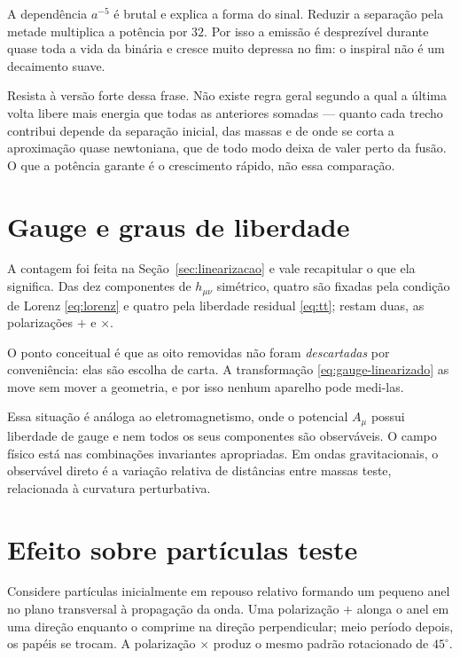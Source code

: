 \documentclass[12pt,a4paper,oneside]{book}
\theoremstyle{rgplain}
\theoremstyle{rgremark}
\begin{document}
\begin{atencao}
A dependência $a^{-5}$ é brutal e explica a forma do sinal. Reduzir a
separação pela metade multiplica a potência por $32$. Por isso a emissão é
desprezível durante quase toda a vida da binária e cresce muito depressa no
fim: o inspiral não é um decaimento suave.

Resista à versão forte dessa frase. Não existe regra geral segundo a qual a
última volta libere mais energia que todas as anteriores somadas --- quanto
cada trecho contribui depende da separação inicial, das massas e de onde se
corta a aproximação quase newtoniana, que de todo modo deixa de valer perto
da fusão. O que a potência garante é o crescimento rápido, não essa
comparação.
\end{atencao}

\section{Gauge e graus de liberdade}

A contagem foi feita na Seção~\ref{sec:linearizacao} e vale recapitular o que
ela significa. Das dez componentes de $h_{\mu\nu}$ simétrico, quatro são
fixadas pela condição de Lorenz \eqref{eq:lorenz} e quatro pela liberdade
residual \eqref{eq:tt}; restam duas, as polarizações $+$ e $\times$.

O ponto conceitual é que as oito removidas não foram \emph{descartadas} por
conveniência: elas são escolha de carta. A transformação
\eqref{eq:gauge-linearizado} as move sem mover a geometria, e por isso nenhum
aparelho pode medi-las.

Essa situação é análoga ao eletromagnetismo, onde o potencial $A_\mu$ possui
liberdade de gauge e nem todos os seus componentes são observáveis. O campo
físico está nas combinações invariantes apropriadas. Em ondas gravitacionais,
o observável direto é a variação relativa de distâncias entre massas teste,
relacionada à curvatura perturbativa.

\section{Efeito sobre partículas teste}

Considere partículas inicialmente em repouso relativo formando um pequeno anel
no plano transversal à propagação da onda. Uma polarização $+$ alonga o anel em
uma direção enquanto o comprime na direção perpendicular; meio período depois,
os papéis se trocam. A polarização $\times$ produz o mesmo padrão rotacionado
de $45^\circ$.
\end{document}
